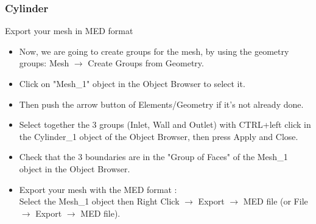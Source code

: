\documentclass[10pt]{beamer}
\begin{document}
\begin{frame}
\frametitle{Cylinder}
\begin{block}{Export your mesh in MED format}

\begin{itemize}
\item Now, we are going to create groups for the mesh, by using the geometry groups: Mesh $\rightarrow$ Create Groups from Geometry.
\item Click on "Mesh\_1" object in the Object Browser to select it.
\item Then push the arrow button of Elements/Geometry if it's not already done.
\item Select together the 3 groups (Inlet, Wall and Outlet) with CTRL+left click in the Cylinder\_1 object of the Object Browser, then press Apply and Close.
\item Check that the 3 boundaries are in the "Group of Faces" of the Mesh\_1 object in the Object Browser.
\item Export your mesh with the MED format :\\
Select the Mesh\_1 object then Right Click $\rightarrow$ Export $\rightarrow$ MED file (or File $\rightarrow$ Export $\rightarrow$ MED file).
\end{itemize}

\end{block}
\end{frame}
\end{document}
